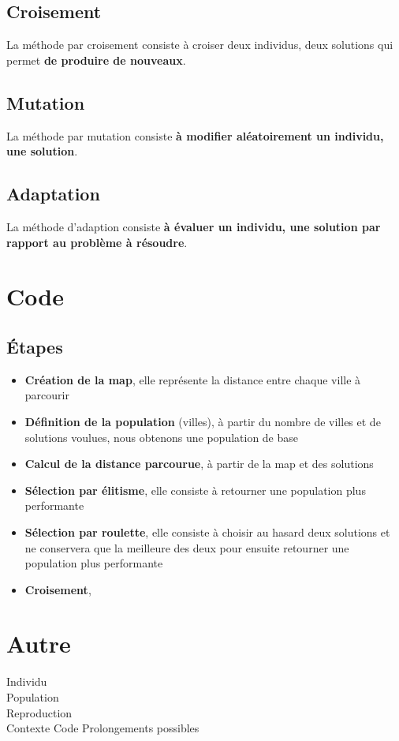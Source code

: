 \documentclass[a4paper,10pt]{report}
\begin{document}
\section*{Croisement}

La méthode par croisement consiste à croiser deux individus, deux solutions qui permet \textbf{de produire de nouveaux}.

\section*{Mutation}

La méthode par mutation consiste \textbf{à modifier aléatoirement un individu, une solution}.

\section*{Adaptation}

La méthode d'adaption consiste \textbf{à évaluer un individu, une solution par rapport au problème à résoudre}.


\chapter*{Code}

\section*{Étapes}

\begin{itemize}
\item \textbf{Création de la map}, elle représente la distance entre chaque ville à parcourir
\item \textbf{Définition de la population} (villes), à partir du nombre de villes et de solutions voulues, nous obtenons
une population de base
\item \textbf{Calcul de la distance parcourue}, à partir de la map et des solutions
\item \textbf{Sélection par élitisme}, elle consiste à retourner une population plus performante
\item \textbf{Sélection par roulette}, elle consiste à choisir au hasard deux solutions et ne conservera
que la meilleure des deux pour ensuite retourner une population plus performante
\item \textbf{Croisement},  
\end{itemize}


\chapter*{Autre}
Individu \\
Population \\
Reproduction \\
Contexte
Code
Prolongements possibles
 
\end{document}
